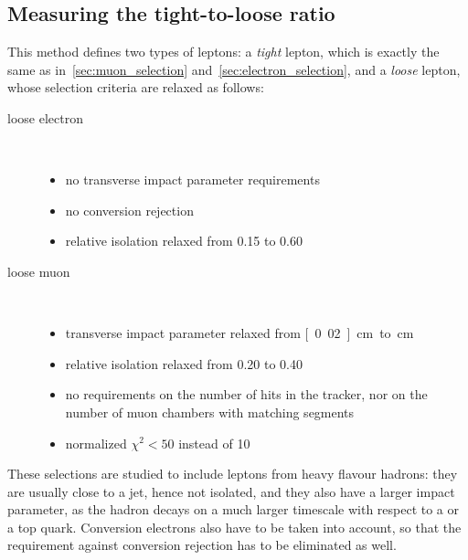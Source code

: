 \subsection{Measuring the tight-to-loose ratio}\label{sec:fake_rate}
This method defines two
types of leptons: a \emph{tight} lepton, which is exactly the same as
in~\ref{sec:muon_selection} and~\ref{sec:electron_selection}, and a
\emph{loose} lepton, whose selection criteria are relaxed as follows:
\begin{description}
    \item[loose electron]\hspace*{\fill}\\
        \begin{itemize}
            \item no transverse impact parameter requirements
            \item no conversion rejection
            \item relative isolation relaxed from 0.15 to 0.60
        \end{itemize}
    \item[loose muon]\hspace*{\fill}\\ 
        \begin{itemize}
            \item transverse impact parameter relaxed from
                \unit[0.02]{cm} to \unit[2]{cm}
            \item relative isolation relaxed from 0.20 to 0.40
            \item no requirements on the number of hits in the tracker, nor
                on the number of muon chambers with matching segments
            \item normalized $\chi^2 < 50$ instead of 10
        \end{itemize}
\end{description}
These selections are studied to include \eg leptons from heavy flavour
hadrons: they are usually close to a jet, hence not isolated, and they also
have a larger impact parameter, as the hadron decays on a much larger
timescale with respect to a \TP or a top quark.
Conversion electrons also have to be taken into account, so that the
requirement against conversion rejection has to be eliminated as well.

